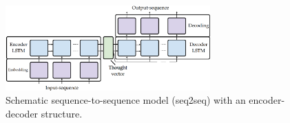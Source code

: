 \begin{figure}[ht]
    \center
    \includegraphics[width=0.70\textwidth]{figures/encoder_decoder_schematic}
	\caption{Schematic sequence-to-sequence model (seq2seq) with an encoder-decoder structure.}
	\label{fig:encoder_decoder}
\end{figure}

